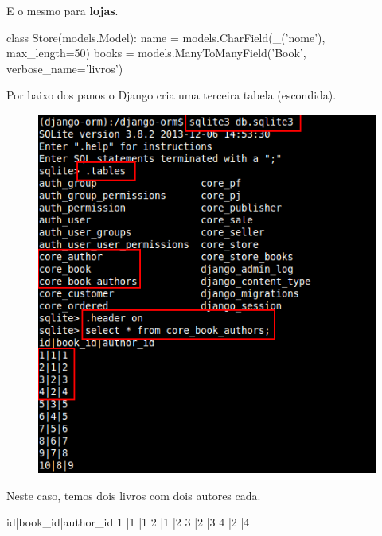 \documentclass[aspectratio=169]{beamer}
\begin{document}
{\begin{frame}[fragile]
\end{frame}


\begin{frame}[fragile]
	
E o mesmo para \textbf{lojas}.

\begin{pythoncode}
class Store(models.Model):
    name = models.CharField(_('nome'), max_length=50)
    books = models.ManyToManyField('Book', verbose_name='livros')
\end{pythoncode}

\end{frame}

\begin{frame}
	
Por baixo dos panos o Django cria uma terceira tabela (escondida).

	\begin{figure}[h]
	  \centering
  		\includegraphics[height=.8\paperheight]{img/sqlite01}
	\end{figure}

Neste caso, temos dois livros com dois autores cada.
\end{frame}

\begin{frame}[fragile]

\begin{bashcode}
id|book_id|author_id
1 |1	  	  |1
2 |1	  	  |2
3 |2	  	  |3
4 |2	  	  |4
\end{bashcode}


\end{frame}}
\end{document}
